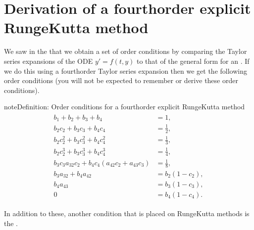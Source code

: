 \documentclass[letterpaper,10pt,english]{jupyterBook}
\begin{document}
\section{Derivation of a fourth\sphinxhyphen{}order explicit Runge\sphinxhyphen{}Kutta method}
\label{\detokenize{2_ERKs/2.2_RK4_Derivation:derivation-of-a-fourth-order-explicit-runge-kutta-method}}\label{\detokenize{2_ERKs/2.2_RK4_Derivation:derivation-of-rk4-section}}\label{\detokenize{2_ERKs/2.2_RK4_Derivation::doc}}
\sphinxAtStartPar
We saw in the {\hyperref[\detokenize{2_ERKs/2.1_ERK_Derivation:rk2-derivation-section}]{}} that we obtain a set of order conditions by comparing the Taylor series expansions of the ODE \(y'=f(t,y)\) to that of the general form for an {\hyperref[\detokenize{2_ERKs/2.0_ERKs:explicit-and-implicit-rk-methods-section}]{}}. If we do this using a fourth\sphinxhyphen{}order Taylor series expansion then we get the following order conditions (you will not be expected to remember or derive these order conditions).

\begin{sphinxadmonition}{note}{Definition: Order conditions for a fourth\sphinxhyphen{}order explicit Runge\sphinxhyphen{}Kutta method}
\begin{equation}\label{equation:2_ERKs/2.2_RK4_Derivation:rk4-order-conditions-equation}
\begin{split}\begin{align}
    b_1 + b_2 + b_3 + b_4 &= 1,\\
    b_2 c_2 + b_3 c_3 + b_4 c_4 &=  \frac{1}{2},\\
    b_2 c_2^2 + b_3 c_3^2 + b_4 c_4^2 &= \frac{1}{3},\\
    b_2 c_2^3 + b_3 c_3^3 + b_4 c_4^3 &= \frac{1}{4},\\
    b_3 c_3 a_{32} c_2 + b_4 c_4 (a_{42} c_2 + a_{43} c_3 ) &= \frac{1}{8},\\
    b_3 a_{32} + b_4 a_{42} &= b_2 (1-c_2 ),\\
    b_4 a_{43} &= b_3 (1 - c_3 ),\\
    0 &= b_4 (1-c_4 ).
\end{align}\end{split}
\end{equation}\end{sphinxadmonition}

\sphinxAtStartPar
In addition to these, another condition that is placed on Runge\sphinxhyphen{}Kutta methods is the .
\end{document}
